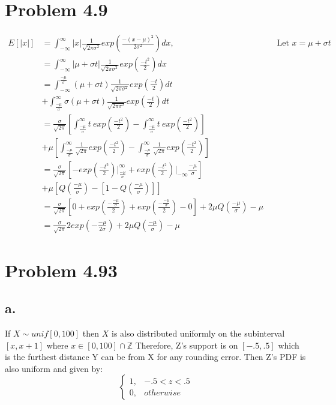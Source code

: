 \documentclass[12pt]{article}
\newcommand{\Z}{\mathbb{Z}}
\newcommand{\normD}[3]{\frac{1}{\sqrt{2\pi #1^2}}exp(\frac{-( #2 - #3)^2}{2 #1^2})}
\begin{document}
\section*{Problem 4.9}
\begin{align*}
  E[|x|] &= \int_{-\infty}^{\infty} |x|\normD{\sigma}{x}{\mu} dx,
    & & \textrm{Let } x = \mu + \sigma t \\
  &= \int_{-\infty}^{\infty} |\mu+\sigma t| \frac{1}{\sqrt{2\pi\sigma^2}}
    exp(\frac{-t^2}{2})dx \\
    &= \int_{-\infty}^{\frac{-\mu}{\sigma}}(\mu+\sigma t)\frac{1}{\sqrt{2\pi\sigma^2}}exp(\frac{-t}{2})dt \\
    &+ \int_{\frac{-\mu}{\sigma}}^\infty{\sigma}(\mu+\sigma t)\frac{1}{\sqrt{2\pi\sigma^2}}exp(\frac{-t}{2})dt \\
    &=\frac{\sigma}{\sqrt{2\pi}}\left[\int_{\frac{-\mu}{\sigma}}^\infty t \ exp(\frac{-t^2}{2}) -
    \int_{\frac{-\mu}{\sigma}}^\infty t \ exp(\frac{-t^2}{2})\right] \\
    &+ \mu\left[\int_{\frac{-\mu}{\sigma}}^\infty \frac{1}{\sqrt{2\pi}}exp(\frac{-t^2}{2})  -
    \int_{\frac{-\mu}{\sigma}}^\infty \frac{1}{\sqrt{2\pi}}exp(\frac{-t^2}{2}) \right] \\
    &=\frac{\sigma}{\sqrt{2\pi}}\left[-exp(\frac{-t^2}{2})\big|_{\frac{-\mu}{\sigma}}^\infty +
    exp(\frac{-t^2}{2})\big|_{-\infty}{\frac{-\mu}{\sigma}}\right] \\
    &+ \mu\left[Q(\frac{-\mu}{\sigma}) -[1-Q(\frac{-\mu}{\sigma})]\right]  \\
    &= \frac{\sigma}{\sqrt{2\pi}}\left[ 0 + exp(\frac{-\frac{-\mu}{\sigma}}{2}) + exp(\frac{-\frac{-\mu}{\sigma}}{2}) - 0 \right]
    + 2\mu Q(\frac{-\mu}{\sigma})-\mu \\
    &= \frac{\sigma}{\sqrt{2\pi}} 2exp\left(-\frac{-\mu}{2\sigma}\right) + 2\mu Q\left(\frac{-\mu}{\sigma}\right)-\mu
\end{align*}
\section*{Problem 4.93}
\subsection*{a.}
If $X \sim unif[0,100]$ then $X$ is also distributed uniformly on the subinterval $[x,x+1]$ where $x \in [0,100]\cap \Z$
Therefore, Z's support is on $[-.5,.5]$ which is the furthest distance Y can be from X for any rounding error. Then Z's
PDF is also uniform and given by: \\
\[ \begin{cases} 
        1, & -.5 < z < .5 \\
        0, & otherwise 
    \end{cases} 
\] \\
\end{document}
